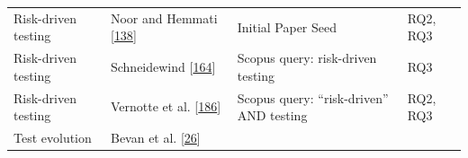 \documentclass[]{book}
\begin{document}
\begin{longtable}[]{@{}llll@{}}
\begin{minipage}[t]{0.18\columnwidth}\raggedright\strut
Risk-driven testing\strut
\end{minipage} & \begin{minipage}[t]{0.16\columnwidth}\raggedright\strut
Noor and Hemmati {[}\protect\hyperlink{ref-noor2015test}{138}{]}\strut
\end{minipage} & \begin{minipage}[t]{0.50\columnwidth}\raggedright\strut
Initial Paper Seed\strut
\end{minipage} & \begin{minipage}[t]{0.04\columnwidth}\raggedright\strut
RQ2, RQ3\strut
\end{minipage}\tabularnewline
\begin{minipage}[t]{0.18\columnwidth}\raggedright\strut
Risk-driven testing\strut
\end{minipage} & \begin{minipage}[t]{0.16\columnwidth}\raggedright\strut
Schneidewind {[}\protect\hyperlink{ref-schneidewind2007}{164}{]}\strut
\end{minipage} & \begin{minipage}[t]{0.50\columnwidth}\raggedright\strut
Scopus query: risk-driven testing\strut
\end{minipage} & \begin{minipage}[t]{0.04\columnwidth}\raggedright\strut
RQ3\strut
\end{minipage}\tabularnewline
\begin{minipage}[t]{0.18\columnwidth}\raggedright\strut
Risk-driven testing\strut
\end{minipage} & \begin{minipage}[t]{0.16\columnwidth}\raggedright\strut
Vernotte et al. {[}\protect\hyperlink{ref-vernotte2015}{186}{]}\strut
\end{minipage} & \begin{minipage}[t]{0.50\columnwidth}\raggedright\strut
Scopus query: ``risk-driven'' AND testing\strut
\end{minipage} & \begin{minipage}[t]{0.04\columnwidth}\raggedright\strut
RQ2, RQ3\strut
\end{minipage}\tabularnewline
\begin{minipage}[t]{0.18\columnwidth}\raggedright\strut
Test evolution\strut
\end{minipage} & \begin{minipage}[t]{0.16\columnwidth}\raggedright\strut
Bevan et al. {[}\protect\hyperlink{ref-bevan2005}{26}{]}\strut

\end{minipage}
\end{longtable}
\end{document}
